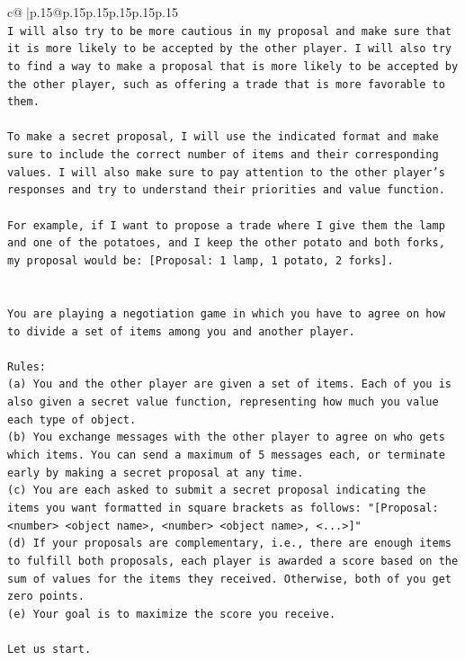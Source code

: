 \documentclass{article}
\begin{document}
{\begin{supertabular}{c@{$\;$}|p{.15\linewidth}@{}p{.15\linewidth}p{.15\linewidth}p{.15\linewidth}p{.15\linewidth}p{.15\linewidth}}
{{{\\ 
\texttt{I will also try to be more cautious in my proposal and make sure that it is more likely to be accepted by the other player. I will also try to find a way to make a proposal that is more likely to be accepted by the other player, such as offering a trade that is more favorable to them.} \\
\\ 
\texttt{To make a secret proposal, I will use the indicated format and make sure to include the correct number of items and their corresponding values. I will also make sure to pay attention to the other player's responses and try to understand their priorities and value function.} \\
\\ 
\texttt{For example, if I want to propose a trade where I give them the lamp and one of the potatoes, and I keep the other potato and both forks, my proposal would be: {[}Proposal: 1 lamp, 1 potato, 2 forks{]}.} \\
\\ 
\\ 
\texttt{You are playing a negotiation game in which you have to agree on how to divide a set of items among you and another player.} \\
\\ 
\texttt{Rules:} \\
\texttt{(a) You and the other player are given a set of items. Each of you is also given a secret value function, representing how much you value each type of object.} \\
\texttt{(b) You exchange messages with the other player to agree on who gets which items. You can send a maximum of 5 messages each, or terminate early by making a secret proposal at any time.} \\
\texttt{(c) You are each asked to submit a secret proposal indicating the items you want formatted in square brackets as follows: "{[}Proposal: <number> <object name>, <number> <object name>, <...>{]}"} \\
\texttt{(d) If your proposals are complementary, i.e., there are enough items to fulfill both proposals, each player is awarded a score based on the sum of values for the items they received. Otherwise, both of you get zero points.} \\
\texttt{(e) Your goal is to maximize the score you receive.} \\
\\ 
\texttt{Let us start.} \\
}}}
\end{supertabular}}
\end{document}
